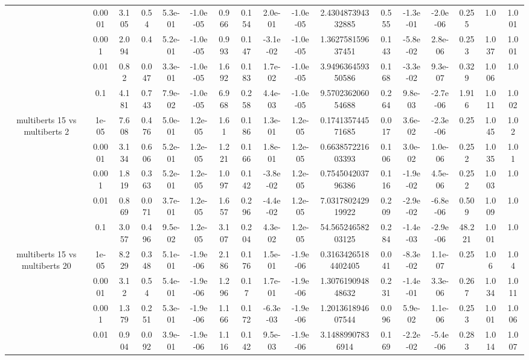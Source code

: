\begin{tabular}{|c|c|c|c|c|c|c|c|c|c|c|c|c|c|c|c|c|}
 & 0.0001 & 3.105 & 0.54 & 5.3e-01 & -1.0e-05 & 0.966 & 0.154 & 2.0e-01 & -1.0e-05 & 2.430487394332885 & 0.555 & -1.3e-01 & -2.0e-06 & 0.255 & 1.0 & 1.001 \\
 & 0.001 & 2.094 & 0.4 & 5.2e-01 & -1.0e-05 & 0.993 & 0.147 & -3.1e-02 & -1.0e-05 & 1.362758159637451 & 0.143 & -5.8e-02 & 2.8e-06 & 0.253 & 1.037 & 1.001 \\
 & 0.01 & 0.82 & 0.047 & 3.3e-01 & -1.0e-05 & 1.692 & 0.183 & 1.7e-02 & -1.0e-05 & 3.949636459350586 & 0.168 & -3.3e-02 & 9.3e-07 & 0.329 & 1.006 & 1.0 \\
 & 0.1 & 4.181 & 0.743 & 7.9e-02 & -1.0e-05 & 6.968 & 0.258 & 4.4e-03 & -1.0e-05 & 9.570236206054688 & 0.264 & 9.8e-03 & -2.7e-06 & 1.916 & 1.011 & 1.002 \\
\hline
\multirow{5}{*}{multiberts 15 vs multiberts 2} & 1e-05 & 7.608 & 0.476 & 5.0e-01 & 1.2e-05 & 1.61 & 0.186 & 1.3e-01 & 1.2e-05 & 0.174135744571685 & 0.017 & 3.6e-02 & -2.3e-06 & 0.25 & 1.045 & 1.02 \\
 & 0.0001 & 3.134 & 0.606 & 5.2e-01 & 1.2e-05 & 1.221 & 0.166 & 1.8e-01 & 1.2e-05 & 0.663857221603393 & 0.106 & 3.0e-02 & 1.0e-06 & 0.252 & 1.035 & 1.01 \\
 & 0.001 & 1.819 & 0.363 & 5.2e-01 & 1.2e-05 & 1.097 & 0.142 & -3.8e-02 & 1.2e-05 & 0.754504203796386 & 0.116 & -1.9e-02 & 4.5e-06 & 0.252 & 1.003 & 1.0 \\
 & 0.01 & 0.869 & 0.071 & 3.7e-01 & 1.2e-05 & 1.657 & 0.296 & -4.4e-02 & 1.2e-05 & 7.031780242919922 & 0.209 & -2.9e-02 & -6.8e-06 & 0.509 & 1.009 & 1.0 \\
 & 0.1 & 3.057 & 0.496 & 9.5e-02 & 1.2e-05 & 3.107 & 0.204 & 4.3e-02 & 1.2e-05 & 54.56524658203125 & 0.284 & -1.4e-03 & -2.9e-06 & 48.221 & 1.001 & 1.0 \\
\hline
\multirow{5}{*}{multiberts 15 vs multiberts 20} & 1e-05 & 8.229 & 0.348 & 5.1e-01 & -1.9e-06 & 2.186 & 0.176 & 1.5e-01 & -1.9e-06 & 0.31634265184402405 & 0.041 & -8.3e-02 & 1.1e-07 & 0.25 & 1.06 & 1.04 \\
 & 0.0001 & 3.12 & 0.54 & 5.4e-01 & -1.9e-06 & 1.296 & 0.17 & 1.7e-01 & -1.9e-06 & 1.307619094848632 & 0.231 & -1.4e-01 & 3.3e-06 & 0.267 & 1.034 & 1.011 \\
 & 0.001 & 1.379 & 0.251 & 5.3e-01 & -1.9e-06 & 1.166 & 0.172 & -6.3e-03 & -1.9e-06 & 1.201361894607544 & 0.096 & 5.9e-02 & 1.1e-06 & 0.253 & 1.001 & 1.006 \\
 & 0.01 & 0.904 & 0.092 & 3.9e-01 & -1.9e-06 & 1.116 & 0.142 & 9.5e-03 & -1.9e-06 & 3.14889907836914 & 0.169 & -2.2e-02 & -5.4e-06 & 0.283 & 1.014 & 1.007 \\

\end{tabular}
